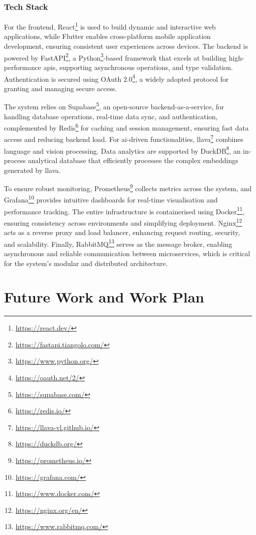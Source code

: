 \subsubsection{Tech Stack}

For the frontend, React\footnote{\url{https://react.dev/}} is used to build dynamic and interactive web applications, while Flutter enables cross-platform mobile application development, ensuring consistent user experiences across devices. The backend is powered by FastAPI\footnote{\url{https://fastapi.tiangolo.com/}}, a Python\footnote{\url{https://www.python.org/}}-based framework that excels at building high-performance \acp{api}, supporting asynchronous operations, and type validation. Authentication is secured using OAuth 2.0\footnote{\url{https://oauth.net/2/}}, a widely adopted protocol for granting and managing secure access.

The system relies on Supabase\footnote{\url{https://supabase.com/}}, an open-source backend-as-a-service, for handling database operations, real-time data sync, and authentication, complemented by Redis\footnote{\url{https://redis.io/}} for caching and session management, ensuring fast data access and reducing backend load. For \ac{ai}-driven functionalities, \ac{llava}\footnote{\url{https://llava-vl.github.io/}} combines language and vision processing. Data analytics are supported by DuckDB\footnote{\url{https://duckdb.org/}}, an in-process analytical database that efficiently processes the complex embeddings generated by \ac{llava}.

To ensure robust monitoring, Prometheus\footnote{\url{https://prometheus.io/}} collects metrics across the system, and Grafana\footnote{\url{https://grafana.com/}} provides intuitive dashboards for real-time visualisation and performance tracking. The entire infrastructure is containerised using Docker\footnote{\url{https://www.docker.com/}}, ensuring consistency across environments and simplifying deployment. Nginx\footnote{\url{https://nginx.org/en/}} acts as a reverse proxy and load balancer, enhancing request routing, security, and scalability. Finally, RabbitMQ\footnote{\url{https://www.rabbitmq.com/}} serves as the message broker, enabling asynchronous and reliable communication between microservices, which is critical for the system's modular and distributed architecture.


\section{Future Work and Work Plan} \label{section:future_work_and_work_plan}

